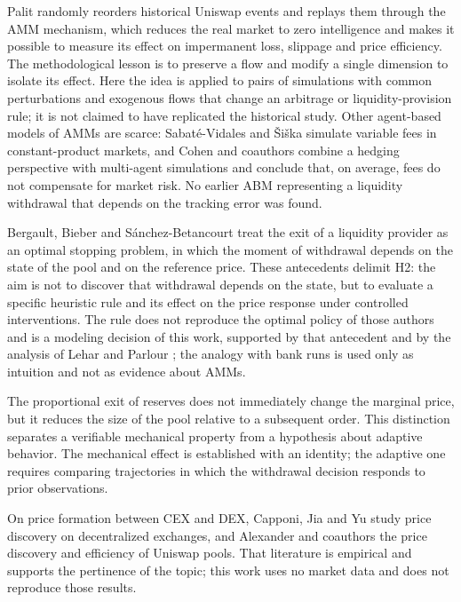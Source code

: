 Palit \cite{palit2022shuffled} randomly reorders historical Uniswap events and replays them through the AMM mechanism, which reduces the real market to zero intelligence and makes it possible to measure its effect on impermanent loss, slippage and price efficiency. The methodological lesson is to preserve a flow and modify a single dimension to isolate its effect. Here the idea is applied to pairs of simulations with common perturbations and exogenous flows that change an arbitrage or liquidity-provision rule; it is not claimed to have replicated the historical study. Other agent-based models of AMMs are scarce: Sabaté-Vidales and Šiška \cite{sabatevidales2023variable} simulate variable fees in constant-product markets, and Cohen and coauthors \cite{cohen2023inefficiency} combine a hedging perspective with multi-agent simulations and conclude that, on average, fees do not compensate for market risk. No earlier ABM representing a liquidity withdrawal that depends on the tracking error was found.

Bergault, Bieber and Sánchez-Betancourt \cite{bergault2025exit} treat the exit of a liquidity provider as an optimal stopping problem, in which the moment of withdrawal depends on the state of the pool and on the reference price. These antecedents delimit H2: the aim is not to discover that withdrawal depends on the state, but to evaluate a specific heuristic rule and its effect on the price response under controlled interventions. The rule does not reproduce the optimal policy of those authors and is a modeling decision of this work, supported by that antecedent and by the analysis of Lehar and Parlour \cite{lehar2025uniswap}; the analogy with bank runs \cite{diamond1983bank} is used only as intuition and not as evidence about AMMs.

The proportional exit of reserves does not immediately change the marginal price, but it reduces the size of the pool relative to a subsequent order. This distinction separates a verifiable mechanical property from a hypothesis about adaptive behavior. The mechanical effect is established with an identity; the adaptive one requires comparing trajectories in which the withdrawal decision responds to prior observations.

On price formation between CEX and DEX, Capponi, Jia and Yu \cite{capponi2026price} study price discovery on decentralized exchanges, and Alexander and coauthors \cite{alexander2025price} the price discovery and efficiency of Uniswap pools. That literature is empirical and supports the pertinence of the topic; this work uses no market data and does not reproduce those results.

